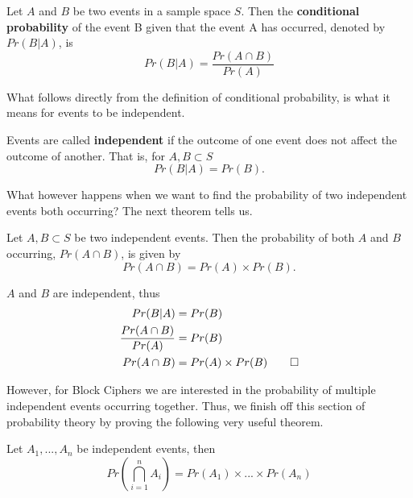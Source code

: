 \begin{defn}
Let $A$ and $B$ be two events in a sample space $S$. Then the 
\textbf{conditional probability} of the event B given that the event A has
occurred, denoted by $Pr(B|A)$, is
\begin{equation}
Pr(B|A) = \frac{Pr(A \cap B)}{Pr(A)}
\end{equation}
\end{defn}

What follows directly from the definition of conditional probability, is 
what it means for events to be independent.

\begin{defn}
Events are called \textbf{independent} if the outcome of one event does
not affect the outcome of another. That is, for $A, B \subset S$
\begin{equation}
Pr(B|A) = Pr(B).
\end{equation}
\end{defn}

What however happens when we want to find the probability of two independent
events both occurring? The next theorem tells us.

\begin{thm}\label{t:indep}
Let $A, B \subset S$ be two independent events. Then the probability of 
both $A$ and $B$ occurring, $Pr(A \cap B)$, is given by
\begin{equation}
Pr(A \cap B) = Pr(A) \times Pr(B).
\end{equation}
\end{thm}

\begin{prf}
$A$ and $B$ are independent, thus 
\begin{align*}
Pr(B|A) &= Pr(B)\\
\frac{Pr(A \cap B)}{Pr(A)} &= Pr(B)\\
Pr(A \cap B) &= Pr(A) \times Pr(B)\hfill\qed\\
\end{align*}
\end{prf}

However, for Block Ciphers we are interested in the probability of 
multiple independent events occurring together. Thus, we finish
off this section of probability theory by proving the following
very useful theorem.

\begin{thm}
Let $A_1, ... , A_n$ be independent events, then 
\begin{equation}
Pr\left(\bigcap _{i=1} ^n A_i \right) = Pr(A_1) \times ... \times Pr(A_n)
\end{equation}
\end{thm}

